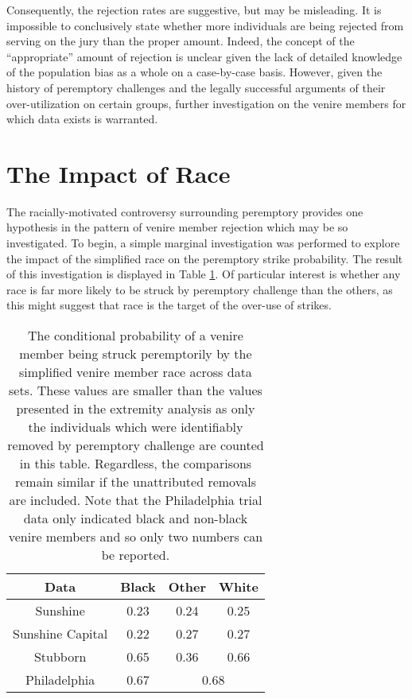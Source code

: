 Consequently, the rejection rates are suggestive, but may be misleading. It is impossible to conclusively state whether more
individuals are being rejected from serving on the jury than the proper amount. Indeed, the concept of the ``appropriate'' amount
of rejection is unclear given the lack of detailed knowledge of the population bias as a whole on a case-by-case basis. However,
given the history of peremptory challenges and the legally successful arguments of their over-utilization on certain groups,
further investigation on the venire members for which data exists is warranted.

\section{The Impact of Race} \label{sec:impactrace} 

The racially-motivated controversy surrounding peremptory provides one hypothesis in the pattern of venire member rejection which
may be so investigated. To begin, a simple marginal investigation was performed to explore the impact of the simplified race on
the peremptory strike probability. The result of this investigation is displayed in Table \ref{tab:margrace}. Of particular
interest is whether any race is far more likely to be struck by peremptory challenge than the others, as this might suggest that
race is the target of the over-use of strikes.

\begin{table}[h!]
  \centering
  \caption[Strike Rate by Race]{\footnotesize The conditional probability of a venire member being struck peremptorily by the simplified venire
    member race across data sets. These values are smaller than the values presented in the extremity analysis as only the
    individuals which were identifiably removed by peremptory challenge are counted in this table. Regardless, the comparisons 
    remain similar if the unattributed removals are included. Note that the Philadelphia trial data only indicated black and
    non-black venire members and so only two numbers can be reported.} \label{tab:margrace}
  \begin{tabular}{|c|c c c|} \hline
    Data & Black & Other & White \\ \hline
    Sunshine & 0.23 & 0.24 & 0.25 \\
    Sunshine Capital & 0.22 & 0.27 & 0.27 \\
    Stubborn & 0.65 & 0.36 & 0.66 \\ 
    Philadelphia & 0.67 & \multicolumn{2}{c|}{0.68} \\ \hline
  \end{tabular}
\end{table}

